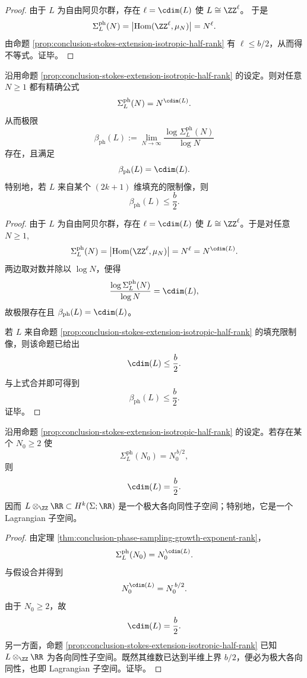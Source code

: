 \begin{proof}
由于 \(L\) 为自由阿贝尔群，存在 \(\ell=\cdim(L)\) 使 \(L\cong \ZZ^\ell\)。
于是
\[
\Sigma_{L}^{\mathrm{ph}}(N)=\bigl|\operatorname{Hom}(\ZZ^\ell,\mu_N)\bigr|
=N^\ell.
\]
由命题 \ref{prop:conclusion-stokes-extension-isotropic-half-rank} 有 \(\ell\le b/2\)，从而得不等式。证毕。
\end{proof}

\begin{theorem}[相位计数的增长指数严格等于晶格秩]\label{thm:conclusion-phase-sampling-growth-exponent-rank}
沿用命题 \ref{prop:conclusion-stokes-extension-isotropic-half-rank} 的设定。则对任意 \(N\ge 1\) 都有精确公式
\[
\Sigma_{L}^{\mathrm{ph}}(N)=N^{\cdim(L)}.
\]
从而极限
\[
\beta_{\mathrm{ph}}(L)
:=
\lim_{N\to\infty}\frac{\log \Sigma_{L}^{\mathrm{ph}}(N)}{\log N}
\]
存在，且满足
\[
\beta_{\mathrm{ph}}(L)=\cdim(L).
\]
特别地，若 \(L\) 来自某个 \((2k+1)\) 维填充的限制像，则
\[
\beta_{\mathrm{ph}}(L)\le \frac{b}{2}.
\]
\end{theorem}
\begin{proof}
由于 \(L\) 为自由阿贝尔群，存在 \(\ell=\cdim(L)\) 使 \(L\cong \ZZ^\ell\)。于是对任意 \(N\ge 1\),
\[
\Sigma_{L}^{\mathrm{ph}}(N)
=
\bigl|\operatorname{Hom}(\ZZ^\ell,\mu_N)\bigr|
=
N^\ell
=
N^{\cdim(L)}.
\]
两边取对数并除以 \(\log N\)，便得
\[
\frac{\log \Sigma_{L}^{\mathrm{ph}}(N)}{\log N}=\cdim(L),
\]
故极限存在且 \(\beta_{\mathrm{ph}}(L)=\cdim(L)\)。

若 \(L\) 来自命题 \ref{prop:conclusion-stokes-extension-isotropic-half-rank} 的填充限制像，则该命题已给出
\[
\cdim(L)\le \frac{b}{2}.
\]
与上式合并即可得到
\[
\beta_{\mathrm{ph}}(L)\le \frac{b}{2}.
\]
证毕。
\end{proof}

\begin{corollary}[一次相位饱和强制达到拉格朗日上限]\label{cor:conclusion-phase-sampling-single-saturation-lagrangian}
沿用命题 \ref{prop:conclusion-stokes-extension-isotropic-half-rank} 的设定。若存在某个 \(N_0\ge 2\) 使
\[
\Sigma_{L}^{\mathrm{ph}}(N_0)=N_0^{\,b/2},
\]
则
\[
\cdim(L)=\frac{b}{2}.
\]
因而 \(L\otimes_\ZZ\RR\subset H^k(\Sigma;\RR)\) 是一个极大各向同性子空间；特别地，它是一个 Lagrangian 子空间。
\end{corollary}
\begin{proof}
由定理 \ref{thm:conclusion-phase-sampling-growth-exponent-rank}，
\[
\Sigma_{L}^{\mathrm{ph}}(N_0)=N_0^{\cdim(L)}.
\]
与假设合并得到
\[
N_0^{\cdim(L)}=N_0^{\,b/2}.
\]
由于 \(N_0\ge 2\)，故
\[
\cdim(L)=\frac{b}{2}.
\]
另一方面，命题 \ref{prop:conclusion-stokes-extension-isotropic-half-rank} 已知 \(L\otimes_\ZZ\RR\) 为各向同性子空间。既然其维数已达到半维上界 \(b/2\)，便必为极大各向同性，也即 Lagrangian 子空间。证毕。
\end{proof}

